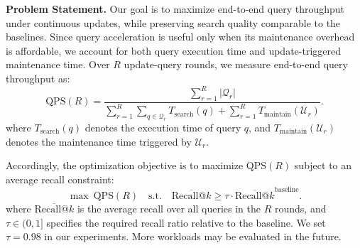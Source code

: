 \noindent\textbf{Problem Statement.}
Our goal is to maximize end-to-end query throughput under continuous updates, while preserving search quality comparable to the baselines. Since query acceleration is useful only when its maintenance overhead is affordable, we account for both query execution time and update-triggered maintenance time. Over $R$ update-query rounds, we measure end-to-end query throughput as:
\begin{equation}
\mathrm{QPS}(R) =
\frac{\sum_{r=1}^{R} |\mathcal{Q}_r|}
{
\sum_{r=1}^{R}\sum_{q\in\mathcal{Q}_r} T_{\mathrm{search}}(q)
+
\sum_{r=1}^{R} T_{\mathrm{maintain}}(\mathcal{U}_r)
}.
\end{equation}
where $T_{\mathrm{search}}(q)$ denotes the execution time of query $q$, and $T_{\mathrm{maintain}}(\mathcal{U}_r)$ denotes the maintenance time triggered by $\mathcal{U}_r$.


Accordingly, the optimization objective is to maximize $\mathrm{QPS}(R)$ subject to an average recall constraint:
\begin{equation}
\max \ \mathrm{QPS}(R)
\quad
\text{s.t.} \quad
\overline{\mathrm{Recall@}k}
\ge
\tau \cdot \overline{\mathrm{Recall@}k}^{\mathrm{baseline}}.
\end{equation}
where $\overline{\mathrm{Recall@}k}$ is the average recall over all queries in the $R$ rounds, and $\tau \in (0,1]$ specifies the required recall ratio relative to the baseline. We set $\tau=0.98$ in our experiments. More workloads may be evaluated in the future.

